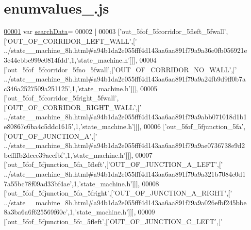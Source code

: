 \hypertarget{enumvalues__9_8js_source}{}\section{enumvalues\+\_.\+js}
\label{enumvalues__9_8js_source}

\begin{DoxyCode}
\hypertarget{enumvalues__9_8js_source.tex_l00001}{}\hyperlink{enumvalues__9_8js_ad01a7523f103d6242ef9b0451861231e}{00001} var \hyperlink{enumvalues__9_8js_ad01a7523f103d6242ef9b0451861231e}{searchData}=
00002 [
00003   [\textcolor{stringliteral}{'out\_5fof\_5fcorridor\_5fleft\_5fwall'},[\textcolor{stringliteral}{'OUT\_OF\_CORRIDOR\_LEFT\_WALL'},[\textcolor{stringliteral}{'
      ../state\_\_machine\_8h.html#a94b1da2e055fff4d143aa6aa891f79a9a36e0fb056921e3c44cbbe999c0814fdd'},1,\textcolor{stringliteral}{'state\_machine.h'}]]],
00004   [\textcolor{stringliteral}{'out\_5fof\_5fcorridor\_5fno\_5fwall'},[\textcolor{stringliteral}{'OUT\_OF\_CORRIDOR\_NO\_WALL'},[\textcolor{stringliteral}{'
      ../state\_\_machine\_8h.html#a94b1da2e055fff4d143aa6aa891f79a9a24fb9d9ff0b7ac346a2527509a251125'},1,\textcolor{stringliteral}{'state\_machine.h'}]]],
00005   [\textcolor{stringliteral}{'out\_5fof\_5fcorridor\_5fright\_5fwall'},[\textcolor{stringliteral}{'OUT\_OF\_CORRIDOR\_RIGHT\_WALL'},[\textcolor{stringliteral}{'
      ../state\_\_machine\_8h.html#a94b1da2e055fff4d143aa6aa891f79a9abb071018d1b1e80867c6ba4c5ddc1615'},1,\textcolor{stringliteral}{'state\_machine.h'}]]],
00006   [\textcolor{stringliteral}{'out\_5fof\_5fjunction\_5fa'},[\textcolor{stringliteral}{'OUT\_OF\_JUNCTION\_A'},[\textcolor{stringliteral}{'
      ../state\_\_machine\_8h.html#a94b1da2e055fff4d143aa6aa891f79a9ae0736738e9d2beffffb2dcce39aecfbf'},1,\textcolor{stringliteral}{'state\_machine.h'}]]],
00007   [\textcolor{stringliteral}{'out\_5fof\_5fjunction\_5fa\_5fleft'},[\textcolor{stringliteral}{'OUT\_OF\_JUNCTION\_A\_LEFT'},[\textcolor{stringliteral}{'
      ../state\_\_machine\_8h.html#a94b1da2e055fff4d143aa6aa891f79a9a321b7084c0d17a55bc78f09ad33bf4ae'},1,\textcolor{stringliteral}{'state\_machine.h'}]]],
00008   [\textcolor{stringliteral}{'out\_5fof\_5fjunction\_5fa\_5fright'},[\textcolor{stringliteral}{'OUT\_OF\_JUNCTION\_A\_RIGHT'},[\textcolor{stringliteral}{'
      ../state\_\_machine\_8h.html#a94b1da2e055fff4d143aa6aa891f79a9a026efbf245bbe8a3ba6a6f625569f60c'},1,\textcolor{stringliteral}{'state\_machine.h'}]]],
00009   [\textcolor{stringliteral}{'out\_5fof\_5fjunction\_5fc\_5fleft'},[\textcolor{stringliteral}{'OUT\_OF\_JUNCTION\_C\_LEFT'},[\textcolor{stringliteral}{'
}
\end{DoxyCode}
